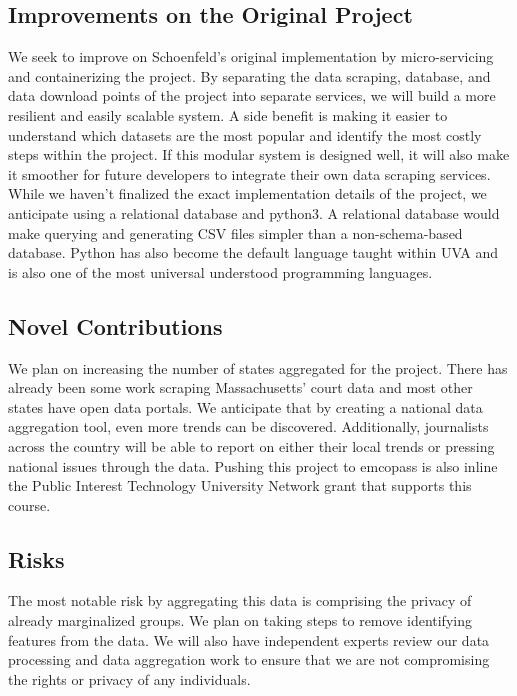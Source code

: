 \documentclass[12pt]{article}
\begin{document}
\subsection{Improvements on the Original Project}

\noindent We seek to improve on Schoenfeld's original implementation by micro-servicing and containerizing the project. 
By separating the data scraping, database, and data download points of the project into separate services, we will build a more resilient and easily scalable system.
A side benefit is making it easier to understand which datasets are the most popular and identify the most costly steps within the project.
If this modular system is designed well, it will also make it smoother for future developers to integrate their own data scraping services.
While we haven't finalized the exact implementation details of the project, we anticipate using a relational database and python3.
A relational database would make querying and generating CSV files simpler than a non-schema-based database.
Python has also become the default language taught within UVA and is also one of the most universal understood programming languages.

\subsection{Novel Contributions}

\noindent We plan on increasing the number of states aggregated for the project. 
There has already been some work scraping Massachusetts' court data and most other states have open data portals.
We anticipate that by creating a national data aggregation tool, even more trends can be discovered.
Additionally, journalists across the country will be able to report on either their local trends or pressing national issues through the data.
Pushing this project to emcopass is also inline the Public Interest Technology University Network grant that supports this course.

\subsection{Risks}

\noindent The most notable risk by aggregating this data is comprising the privacy of already marginalized groups.
We plan on taking steps to remove identifying features from the data.
We will also have independent experts review our data processing and data aggregation work to ensure that we are not compromising the rights or privacy of any individuals.
\end{document}
